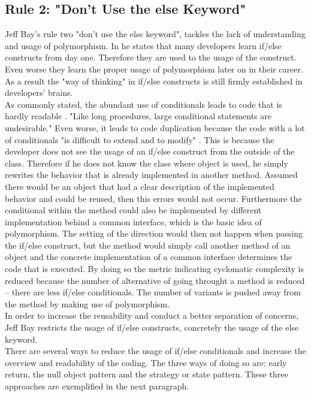 \subsection*{Rule 2: "Don’t Use the else Keyword"}
\label{describe:rule2}
Jeff Bay's rule two "don’t use the else keyword", tackles the lack of understanding and usage of polymorphism. 
In \cite{oc2008} he states that many developers learn if/else constructs from day one. Therefore they are used to the usage of the construct. Even worse they learn the proper usage of polymorphism later on in their career. As a result the "way of thinking" in if/else constructs is still firmly established in developers' brains.
\\

As commonly stated, the abundant use of conditionals leads to code that is hardly readable \cite[p. 338]{gof}. "Like long procedures, large conditional statements are undesirable." \cite[p. 340]{gof} Even worse, it leads to code duplication because the code with a lot of conditionals "is difficult to extend and to modify" \cite{gof}. This is because the developer does not see the usage of an if/else construct from the outside of the class. Therefore if he does not know the class where object is used, he simply rewrites the behavior that is already implemented in another method. Assumed there would be an object that had a clear description of the implemented behavior and could be reused, then this errors would not occur. Furthermore the conditional within the method could also be implemented by different implementation behind a common interface, which is the basic idea of polymorphism. The setting of the direction would then not happen when passing the if/else construct, but the method would simply call another method of an object and the concrete implementation of a common interface determines the code that is executed. By doing so the metric indicating cyclomatic complexity is reduced because the number of alternative of going throught a method is reduced -- there are less if/else conditionals. The number of variants is pushed away from the method by making use of polymorphism.
\\

In order to increase the reusability and conduct a better separation of concerns, Jeff Bay restricts the usage of if/else constructs, concretely the usage of the else keyword.
\\

There are several ways to reduce the usage of if/else conditionals and increase the overview and readability of the coding. The three ways of doing so are: early return, the null object pattern and the strategy or state pattern. These three approaches are exemplified in the next paragraph. 

